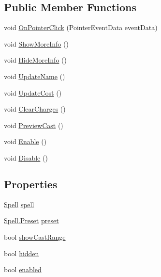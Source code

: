 \subsection*{Public Member Functions}
\begin{DoxyCompactItemize}
\item 
void \mbox{\hyperlink{class_hotkey_a86ced9a614ad8d537fcab4738abcb0ef}{On\+Pointer\+Click}} (Pointer\+Event\+Data event\+Data)
\item 
void \mbox{\hyperlink{class_hotkey_ae8ab38a3ddf49344ede61f8fb67892c5}{Show\+More\+Info}} ()
\item 
void \mbox{\hyperlink{class_hotkey_a9362ee088eb695642f30c3b8818d0b1a}{Hide\+More\+Info}} ()
\item 
void \mbox{\hyperlink{class_hotkey_a414aefec4d51bfa4b6fc68fcb8dce841}{Update\+Name}} ()
\item 
void \mbox{\hyperlink{class_hotkey_a15822d970e7f05f8ea8ef4069a4e245a}{Update\+Cost}} ()
\item 
void \mbox{\hyperlink{class_hotkey_a7d290d1777e2971d3bbf99d23322d4af}{Clear\+Charges}} ()
\item 
void \mbox{\hyperlink{class_hotkey_a209f6726592cf69b7e21bd68ced48cb3}{Preview\+Cast}} ()
\item 
void \mbox{\hyperlink{class_hotkey_ae078d4716dbd3a3c703a3ef341e56562}{Enable}} ()
\item 
void \mbox{\hyperlink{class_hotkey_a0b90f1841f8cbe70bf62447affd70bd1}{Disable}} ()
\end{DoxyCompactItemize}
\subsection*{Properties}
\begin{DoxyCompactItemize}
\item 
\mbox{\hyperlink{class_spell}{Spell}} \mbox{\hyperlink{class_hotkey_acdccc2b352e81fbc8075f5ddb77cd6df}{spell}}
\item 
\mbox{\hyperlink{class_spell_a5520e850e7000a6156b3456672b72ed1}{Spell.\+Preset}} \mbox{\hyperlink{class_hotkey_a98f88450edff67278329260ff2e5ce2b}{preset}}
\item 
bool \mbox{\hyperlink{class_hotkey_a960d18fbb18716a6cb3db53b46981cd1}{show\+Cast\+Range}}
\item 
bool \mbox{\hyperlink{class_hotkey_aff210fac7bfb6cfdf469b02d6cd7e71a}{hidden}}
\item 
bool \mbox{\hyperlink{class_hotkey_a91d3325ffb1aa3fd83dbe59f6630b796}{enabled}}
\end{DoxyCompactItemize}


